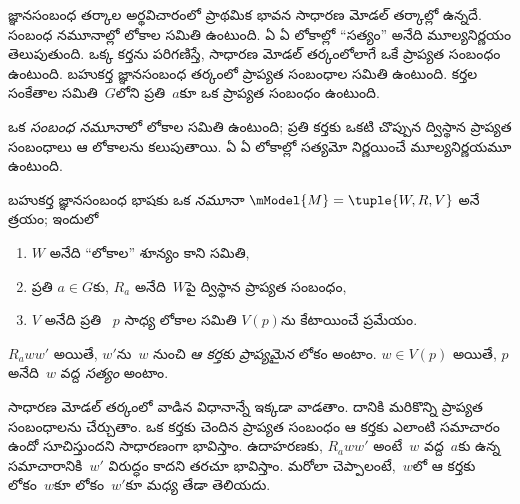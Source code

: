 \documentclass[../../../include/open-logic-section]{subfiles}
\begin{document}


జ్ఞానసంబంధ తర్కాల అర్థవిచారంలో ప్రాథమిక భావన సాధారణ
మోడల్ తర్కాల్లో ఉన్నదే. సంబంధ నమూనాల్లో లోకాల సమితి ఉంటుంది.
ఏ  ఏ లోకాల్లో ``సత్యం'' అనేది మూల్యనిర్ణయం
తెలుపుతుంది. ఒక్క కర్తను పరిగణిస్తే,
సాధారణ మోడల్ తర్కంలోలాగే ఒకే ప్రాప్యత సంబంధం ఉంటుంది.
బహుకర్త జ్ఞానసంబంధ తర్కంలో ప్రాప్యత సంబంధాల సమితి ఉంటుంది.
కర్తల సంకేతాల సమితి~$G$లోని ప్రతి~$a$కూ ఒక ప్రాప్యత సంబంధం ఉంటుంది.

ఒక \emph{సంబంధ నమూనా}లో లోకాల సమితి ఉంటుంది;
ప్రతి కర్తకు ఒకటి చొప్పున ద్విస్థాన ప్రాప్యత
సంబంధాలు ఆ లోకాలను కలుపుతాయి. ఏ
ఏ లోకాల్లో సత్యమో నిర్ణయించే మూల్యనిర్ణయమూ ఉంటుంది.

\begin{defn}
  బహుకర్త జ్ఞానసంబంధ భాషకు ఒక \emph{నమూనా}
  $\mModel{M} = \tuple{W, R, V}$ అనే త్రయం; ఇందులో
  \begin{enumerate}
  \item $W$ అనేది ``లోకాల'' శూన్యం కాని సమితి,
  \item ప్రతి $a \in G$కు, ${R}_a$ అనేది~$W$పై
  ద్విస్థాన ప్రాప్యత సంబంధం,
  \item $V$ అనేది ప్రతి ~$p$ సాధ్య లోకాల సమితి $V(p)$ను
    కేటాయించే ప్రమేయం.
  \end{enumerate}
  $R_a ww'$ అయితే, $w'$ను~$w$ నుంచి
  \emph{ఆ కర్తకు ప్రాప్యమైన} లోకం అంటాం.
  $w \in V(p)$ అయితే, $p$ అనేది~$w$ వద్ద
  \emph{సత్యం} అంటాం.
\end{defn}

సాధారణ మోడల్ తర్కంలో వాడిన విధానాన్నే ఇక్కడా వాడతాం.
దానికి మరికొన్ని ప్రాప్యత సంబంధాలను చేర్చుతాం. ఒక కర్తకు చెందిన
ప్రాప్యత సంబంధం ఆ కర్తకు ఎలాంటి సమాచారం ఉందో సూచిస్తుందని
సాధారణంగా భావిస్తాం. ఉదాహరణకు, $R_a ww'$
అంటే~$w$ వద్ద~$a$కు ఉన్న సమాచారానికి~$w'$ విరుద్ధం కాదని
తరచూ భావిస్తాం. మరోలా చెప్పాలంటే,~$w$లో ఆ కర్తకు
లోకం~$w$కూ లోకం~$w'$కూ మధ్య తేడా తెలియదు.
\end{document}
